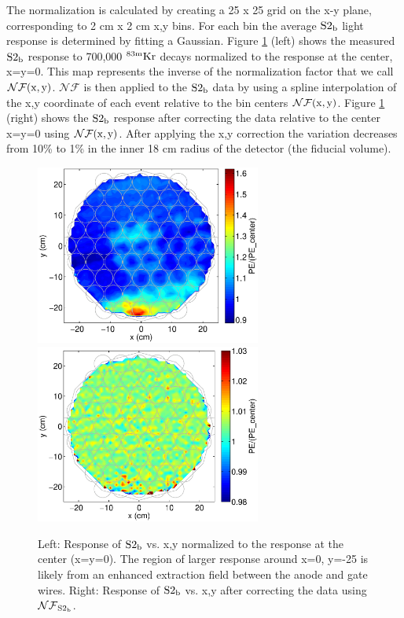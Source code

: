 The normalization is calculated by creating a 25 x 25 grid on the x-y plane, corresponding to 2 cm x 2 cm x,y bins. For each bin the average $\rm S2_b$ light response is determined by fitting a Gaussian. Figure \ref{fig:S2_XY_norm_center} (left) shows the measured $\rm S2_b$ response to 700,000 $\rm^{83m}Kr$ decays normalized to the response at the center, x=y=0. This map represents the inverse of the normalization factor that we call $\rm\mathcal{NF}(x,y)$. $\mathcal{NF}$ is then applied to the $\rm S2_b$ data by using a spline interpolation of the x,y coordinate of each event relative to the bin centers $\rm\mathcal{NF}(x,y)$. Figure \ref{fig:S2_XY_norm_center} (right) shows the $\rm S2_b$ response after correcting the data relative to the center x=y=0 using $\rm\mathcal{NF}(x,y)$. After applying the x,y correction the variation decreases from 10\% to 1\% in the inner 18 cm radius of the detector (the fiducial volume).


\begin{figure}[h!]\centering
\includegraphics[width=74mm]{Chapter_XYZ_Corr/Thesis_Corr_Plots/S2_b_1cm_1cm/S2_b_XY_1cm_norm.eps}
\includegraphics[width=74mm]{Chapter_XYZ_Corr/Thesis_Corr_Plots/S2_b_1cm_1cm/S2_b_XY_1cm_norm_FlatField.eps}
\caption{Left: Response of $\rm S2_b$ vs. x,y normalized to the response at the center (x=y=0). The region of larger response around x=0, y=-25 is likely from an enhanced extraction field between the anode and gate wires. Right: Response of $\rm S2_b$ vs. x,y after correcting the data using $\rm\mathcal{NF}_{S2_b}$. }
\label{fig:S2_XY_norm_center}
\end{figure}


